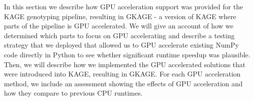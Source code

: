 In this section we describe how GPU acceleration support was provided for the KAGE genotyping pipeline, resulting in GKAGE - a version of KAGE where parts of the pipeline is GPU accelerated.
We will give an account of how we determined which parts to focus on GPU accelerating and describe a testing strategy that we deployed that allowed us to GPU accelerate existing NumPy code directly in Python to see whether significant runtime speedup was plausible.
Then, we will describe how we implemented the GPU accelerated solutions that were introduced into KAGE, resulting in GKAGE.
For each GPU acceleration method, we include an assessment showing the effects of GPU acceleration and how they compare to previous CPU runtimes.

